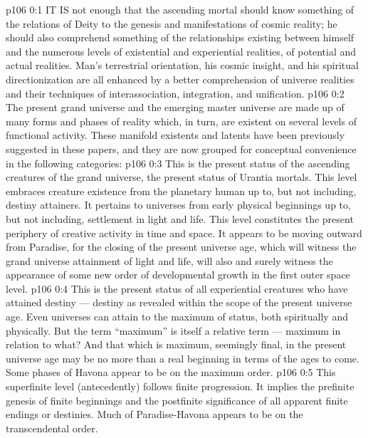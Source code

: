 \vs p106 0:1 IT IS not enough that the ascending mortal should know something of the relations of Deity to the genesis and manifestations of cosmic reality; he should also comprehend something of the relationships existing between himself and the numerous levels of existential and experiential realities, of potential and actual realities. Man’s terrestrial orientation, his cosmic insight, and his spiritual directionization are all enhanced by a better comprehension of universe realities and their techniques of interassociation, integration, and unification.
\vs p106 0:2 The present grand universe and the emerging master universe are made up of many forms and phases of reality which, in turn, are existent on several levels of functional activity. These manifold existents and latents have been previously suggested in these papers, and they are now grouped for conceptual convenience in the following categories:
\vs p106 0:3 \bibnobreakspace {} This is the present status of the ascending creatures of the grand universe, the present status of Urantia mortals. This level embraces creature existence from the planetary human up to, but not including, destiny attainers. It pertains to universes from early physical beginnings up to, but not including, settlement in light and life. This level constitutes the present periphery of creative activity in time and space. It appears to be moving outward from Paradise, for the closing of the present universe age, which will witness the grand universe attainment of light and life, will also and surely witness the appearance of some new order of developmental growth in the first outer space level.
\vs p106 0:4 \pc {}\bibnobreakspace {} This is the present status of all experiential creatures who have attained destiny --- destiny as revealed within the scope of the present universe age. Even universes can attain to the maximum of status, both spiritually and physically. But the term “maximum” is itself a relative term --- maximum in relation to what? And that which is maximum, seemingly final, in the present universe age may be no more than a real beginning in terms of the ages to come. Some phases of Havona appear to be on the maximum order.
\vs p106 0:5 \pc {}\bibnobreakspace {} This superfinite level (antecedently) follows finite progression. It implies the prefinite genesis of finite beginnings and the postfinite significance of all apparent finite endings or destinies. Much of Paradise\hyp{}Havona appears to be on the transcendental order.
